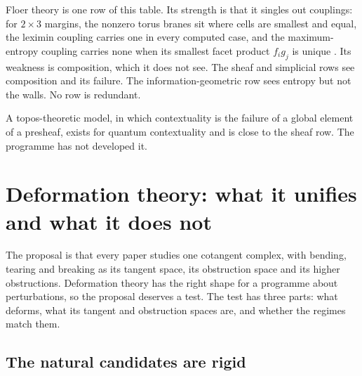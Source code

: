 \documentclass[11pt]{article}
\theoremstyle{definition}
\theoremstyle{remark}
\begin{document}
Floer theory is one row of this table. Its strength is that it singles out couplings: for $2\times3$ margins, the nonzero torus branes sit
where cells are smallest and equal, the leximin coupling carries one in every computed case, and the maximum-entropy coupling carries none
when its smallest facet product $f_ig_j$ is unique \cite[Thm.~8.2]{Bridges}. Its weakness is composition, which it does not see. The sheaf and simplicial rows
see composition and its failure. The information-geometric row sees entropy but not the walls. No row is redundant.

A topos-theoretic model, in which contextuality is the failure of a global element of a presheaf, exists for quantum contextuality
\cite{IshamButterfield1998} and is close to the sheaf row. The programme has not developed it.

\section{Deformation theory: what it unifies and what it does not}\label{sec:deformation}

The proposal is that every paper studies one cotangent complex, with bending, tearing and breaking as its tangent space, its obstruction
space and its higher obstructions. Deformation theory has the right shape for a programme about perturbations, so the proposal deserves a
test. The test has three parts: what deforms, what its tangent and obstruction spaces are, and whether the regimes match them.

\subsection{The natural candidates are rigid}
\end{document}
